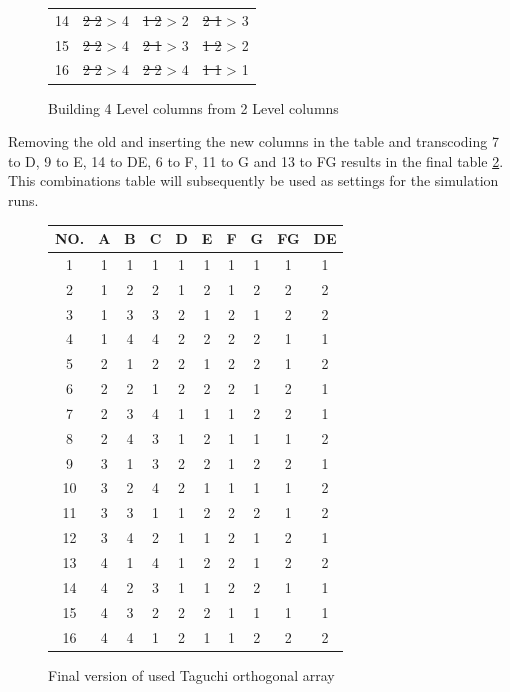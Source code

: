 \begin{figure}[ht]
\begin{tabular}{ |c||cccc|cccc|cccc|  }
		14 & \multicolumn{4}{c}{\sout{2 2} > 4 } & \multicolumn{4}{|c|}{\sout{1 2} > 2 } & \multicolumn{4}{c|}{\sout{2 1} > 3 }\\
		15 & \multicolumn{4}{c}{\sout{2 2} > 4 } & \multicolumn{4}{|c|}{\sout{2 1} > 3 } & \multicolumn{4}{c|}{\sout{1 2} > 2 }\\
		16 & \multicolumn{4}{c}{\sout{2 2} > 4 } & \multicolumn{4}{|c|}{\sout{2 2} > 4 } & \multicolumn{4}{c|}{\sout{1 1} > 1 }\\
		\hline
	\end{tabular}
	\caption{Building 4 Level columns from 2 Level columns}
	\label{table:hyperparameter_tuning:merging_columns}
\end{figure}

Removing the old and inserting the new columns in the table and transcoding 7 to D, 9 to E, 14 to DE, 6 to F, 11 to G and 13 to FG results in the final table \ref{table:hyperparameter_tuning:final_taguchi}.
This combinations table will subsequently be used as settings for the simulation runs.

\begin{figure}[ht]
	\centering
	\begin{tabular}{ |c||c|c|c|c|c|c|c|c|c|  }
		\hline
		NO.& A & B & C & D & E & F & G & FG& DE\\
		\hline
		1  & 1 & 1 & 1 & 1 & 1 & 1 & 1 & 1 & 1\\
		2  & 1 & 2 & 2 & 1 & 2 & 1 & 2 & 2 & 2\\
		3  & 1 & 3 & 3 & 2 & 1 & 2 & 1 & 2 & 2\\
		4  & 1 & 4 & 4 & 2 & 2 & 2 & 2 & 1 & 1\\
		5  & 2 & 1 & 2 & 2 & 1 & 2 & 2 & 1 & 2\\
		6  & 2 & 2 & 1 & 2 & 2 & 2 & 1 & 2 & 1\\
		7  & 2 & 3 & 4 & 1 & 1 & 1 & 2 & 2 & 1\\
		8  & 2 & 4 & 3 & 1 & 2 & 1 & 1 & 1 & 2\\
		9  & 3 & 1 & 3 & 2 & 2 & 1 & 2 & 2 & 1\\
		10 & 3 & 2 & 4 & 2 & 1 & 1 & 1 & 1 & 2\\
		11 & 3 & 3 & 1 & 1 & 2 & 2 & 2 & 1 & 2\\
		12 & 3 & 4 & 2 & 1 & 1 & 2 & 1 & 2 & 1\\
		13 & 4 & 1 & 4 & 1 & 2 & 2 & 1 & 2 & 2\\
		14 & 4 & 2 & 3 & 1 & 1 & 2 & 2 & 1 & 1\\
		15 & 4 & 3 & 2 & 2 & 2 & 1 & 1 & 1 & 1\\
		16 & 4 & 4 & 1 & 2 & 1 & 1 & 2 & 2 & 2\\
		\hline
	\end{tabular}
	\caption{Final version of used Taguchi orthogonal array}
	\label{table:hyperparameter_tuning:final_taguchi}
\end{figure}



